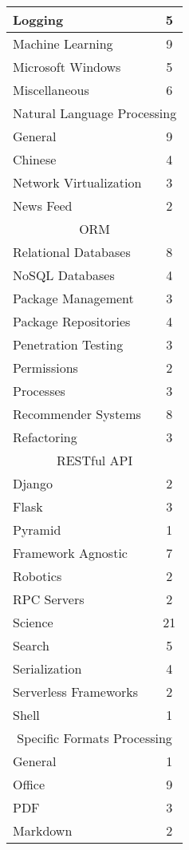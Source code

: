 \begin{longtable} {|l|c|}
    \hline
    Logging & 5\\
    \hline
    Machine Learning & 9\\
    \hline
    Microsoft Windows & 5\\
    \hline
    Miscellaneous & 6\\
    \hline
    \multicolumn{2}{|c|}{Natural Language Processing}\\
    \hline
    General & 9\\
    Chinese & 4\\
    \hline
    Network Virtualization & 3\\
    \hline
    News Feed & 2\\
    \hline
    \multicolumn{2}{|c|}{ORM}\\
    \hline
    Relational Databases & 8\\
    NoSQL Databases & 4\\
    \hline
    Package Management & 3\\
    \hline
    Package Repositories & 4\\
    \hline
    Penetration Testing & 3\\
    \hline
    Permissions & 2\\
    \hline
    Processes & 3\\
    \hline
    Recommender Systems & 8\\
    \hline
    Refactoring & 3\\
    \hline
    \multicolumn{2}{|c|}{RESTful API}\\
    \hline
    Django & 2\\
    Flask & 3\\
    Pyramid & 1\\
    Framework Agnostic & 7\\
    \hline
    Robotics & 2\\
    \hline
    RPC Servers & 2\\
    \hline
    Science & 21\\
    \hline
    Search & 5\\
    \hline
    Serialization & 4\\
    \hline
    Serverless Frameworks & 2\\
    \hline
    Shell & 1\\
    \hline
    \multicolumn{2}{|c|}{Specific Formats Processing}\\
    \hline
    General & 1\\
    Office & 9\\
    PDF & 3\\
    Markdown & 2\\

\end{longtable}
